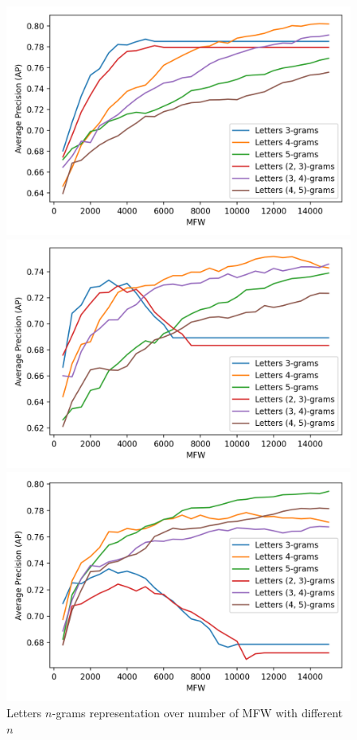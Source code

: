 \begin{figure}
  \caption{Letters $n$-grams representation over number of MFW with different $n$}
  \label{fig:letter_ngrams}

  \label{fig:letter_ngrams_oxquarry}
  \includegraphics[width=\linewidth]{img/letter_ngrams_oxquarry.png}

  \label{fig:letter_ngrams_brunet}
  \includegraphics[width=\linewidth]{img/letter_ngrams_brunet.png}

  \label{fig:letter_ngrams_st_jean}
  \includegraphics[width=\linewidth]{img/letter_ngrams_st_jean.png}
\end{figure}

